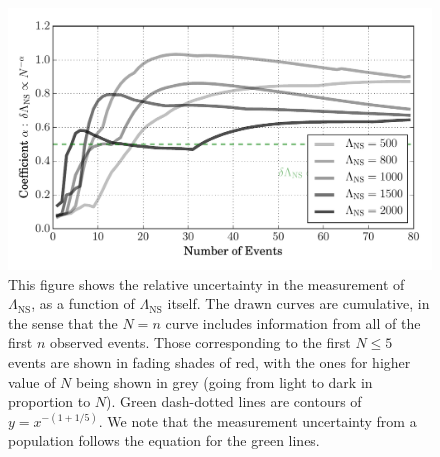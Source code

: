 \documentclass[aps,prd,amsmath,floats,floatfix, twocolumn,
superscriptaddress,nofootinbib,showpacs]{revtex4-1}
\newcommand{\prayush}{\textcolor{red!40!black}}
\newcommand{\lambdans}{\Lambda_\mathrm{NS}}
\begin{document}
%

% 
\begin{figure}
\centering    
\includegraphics[width=\columnwidth]{plots/PowerLawCoefficient_LambdaErrorvsN_vs_Lambda.pdf}
\caption{This figure shows the relative uncertainty in the measurement of $\lambdans$,
as a function of $\lambdans$ itself. The drawn curves are cumulative, in the sense 
that the $N=n$ curve includes information from all of the first $n$ observed events.
Those corresponding to the first $N\leq 5$ events are shown in fading shades of red,
with the ones for higher value of $N$ being shown in grey (going from light to dark in
proportion to $N$).
Green dash-dotted lines are contours of $y=x^{-(1+1/5)}$.
% 
\prayush{We note that the measurement uncertainty from a population follows the
equation for the green lines.}
% 
}
\label{fig:TT_PowerLawLambdaErrorVsN}
\end{figure}
%
\end{document}
